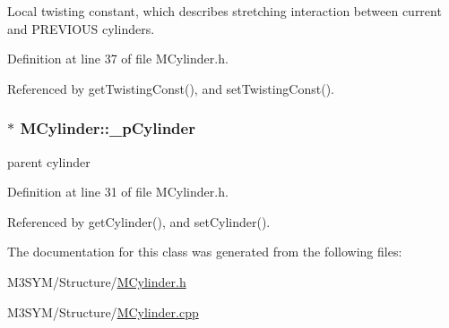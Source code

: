 Local twisting constant, which describes stretching interaction between current and P\+R\+E\+V\+I\+O\+U\+S cylinders. 



Definition at line 37 of file M\+Cylinder.\+h.



Referenced by get\+Twisting\+Const(), and set\+Twisting\+Const().

\hypertarget{classMCylinder_ae7264ecc5bc382231f37821347db7f82}{
\subsubsection[{\+\_\+p\+Cylinder}]{$\ast$ M\+Cylinder\+::\+\_\+p\+Cylinder\hspace{0.3cm}{\ttfamily [private]}}}\label{classMCylinder_ae7264ecc5bc382231f37821347db7f82}


parent cylinder 



Definition at line 31 of file M\+Cylinder.\+h.



Referenced by get\+Cylinder(), and set\+Cylinder().



The documentation for this class was generated from the following files\+:\begin{DoxyCompactItemize}
\item 
M3\+S\+Y\+M/\+Structure/\hyperlink{MCylinder_8h}{M\+Cylinder.\+h}\item 
M3\+S\+Y\+M/\+Structure/\hyperlink{MCylinder_8cpp}{M\+Cylinder.\+cpp}\end{DoxyCompactItemize}

